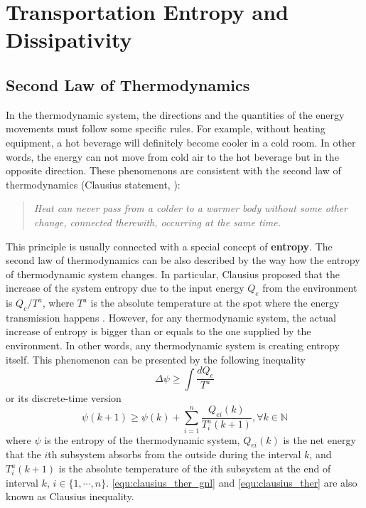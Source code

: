 \documentclass[preprint,authoryear,12pt]{elsarticle}
\begin{document}
\section{Transportation Entropy and Dissipativity}\label{sec:entropy}

\subsection{Second Law of Thermodynamics}

In the thermodynamic system, the directions and the quantities of the
energy movements must follow some specific rules. For example,
without heating equipment, a hot beverage will definitely become
cooler in a cold room. In other words, the energy can not move from
cold air to the hot beverage but in the opposite direction. These
phenomenons are consistent with the second law of thermodynamics
(Clausius statement, \citet{clausius_mechanical_1867}):
\begin{quotation}
\it Heat can never pass from a colder to a warmer body without some
other change, connected therewith, occurring at the same time.
\end{quotation}

This principle is usually connected with a special concept of
\textbf{entropy}. The second law of thermodynamics can be also
described by the way how the entropy of thermodynamic system changes.
In particular, Clausius proposed that the increase of the system
entropy due to the input energy $Q_e$ from the environment is
$Q_e/T^a$, where $T^a$ is the absolute temperature at the spot where
the energy transmission happens \citep{clausius_mechanical_1867}.
However, for any thermodynamic system, the actual increase of entropy
is bigger than or equals to the one supplied by the environment. In
other words, any thermodynamic system is creating entropy itself.
This phenomenon can be presented by the following inequality
\begin{equation}\label{equ:clausius_ther_gnl}
\Delta \psi \ge \int\frac{dQ_e}{T^a}
\end{equation}
or its discrete-time version \citep{haddad_thermodynamic_2005}
\begin{equation}\label{equ:clausius_ther}
\psi(k+1) \ge \psi(k)+\sum_{i=1}^{n}\frac{Q_{ei}(k)}{T^a_i(k+1)},
\forall k\in\mathbb{N}
\end{equation}
where $\psi$ is the entropy of the thermodynamic system, $Q_{ei}(k)$
is the net energy that the $i$th subsystem absorbs from the outside
during the interval $k$, and $T^a_i(k+1)$ is the absolute temperature
of the $i$th subsystem at the end of interval $k$,
$i\in\{1,\cdots,n\}$. \eqref{equ:clausius_ther_gnl} and
\eqref{equ:clausius_ther} are also known as Clausius inequality.
\end{document}
